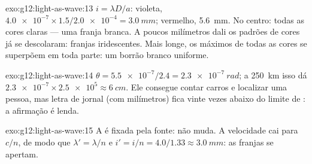 \begin{solution}{exo:g12:light-as-wave:13}
$i = \lambda D/a$: violeta,
$\num{4.0e-7} \times 1.5/\num{2.0e-4} = \qty{3.0}{mm}$; vermelho,
\qty{5.6}{mm}. No centro: todas as cores claras --- uma franja branca. A
poucos milímetros dali os padrões de cores já se descolaram: franjas
iridescentes. Mais longe, os máximos de todas as cores se superpõem em
toda parte: um borrão branco uniforme.
\end{solution}

\begin{solution}{exo:g12:light-as-wave:14}
$\theta = \num{5.5e-7}/2.4 = \qty{2.3e-7}{rad}$; a \qty{250}{km} isso dá
$\num{2.3e-7} \times \num{2.5e5} \approx \qty{6}{cm}$. Ele consegue
contar carros e localizar uma pessoa, mas letra de jornal (com
milímetros) fica vinte vezes abaixo do limite de : a afirmação é
lenda.
\end{solution}

\begin{solution}{exo:g12:light-as-wave:15}
A  é fixada pela fonte: não muda. A velocidade cai para $c/n$,
de modo que $\lambda' = \lambda/n$ e
$i' = i/n = 4.0/1.33 \approx \qty{3.0}{mm}$: as franjas se apertam.
\end{solution}

